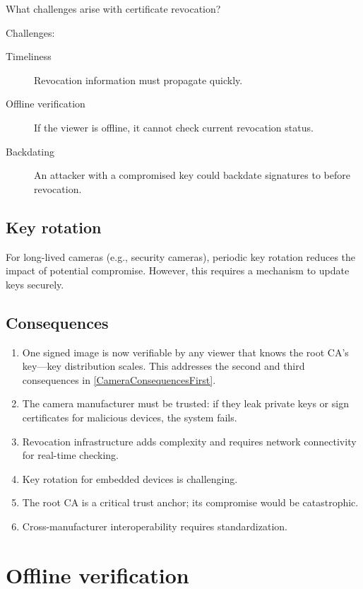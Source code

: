 \begin{exercise}
  What challenges arise with certificate revocation?
\end{exercise}

Challenges:
\begin{description}
  \item[Timeliness] Revocation information must propagate quickly.
  \item[Offline verification] If the viewer is offline, it cannot check
    current revocation status.
  \item[Backdating] An attacker with a compromised key could backdate
    signatures to before revocation.
\end{description}

\subsection{Key rotation}

For long-lived cameras (e.g., security cameras), periodic key rotation
reduces the impact of potential compromise.
However, this requires a mechanism to update keys securely.

\subsection{Consequences}

\begin{enumerate}
  \item One signed image is now verifiable by any viewer that knows the
    root \ac{CA}'s key---key distribution scales.
    This addresses the second and third consequences in
    \cref{CameraConsequencesFirst}.
  \item The camera manufacturer must be trusted: if they leak private
    keys or sign certificates for malicious devices, the system fails.
  \item Revocation infrastructure adds complexity and requires network
    connectivity for real-time checking.
  \item Key rotation for embedded devices is challenging.
  \item The root CA is a critical trust anchor; its compromise would be
    catastrophic.
  \item Cross-manufacturer interoperability requires standardization.
\end{enumerate}


\section{Offline verification}\label{CameraOfflineVerification}

